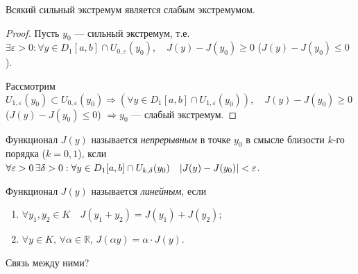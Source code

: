 \begin{utv}
	Всякий сильный экстремум является слабым экстремумом.
\end{utv}
\begin{proof}
	Пусть $y_0$ --- сильный экстремум, т.е. $\exists \varepsilon > 0 : \forall y \in D_1[a, b] \cap U_{0, \varepsilon}(y_0), \quad J(y) - J(y_0) \geqslant 0$ ($J(y) - J(y_0) \leqslant 0$).
	
	Рассмотрим $U_{1, \varepsilon}(y_0) \subset U_{0, \varepsilon}(y_0) \Rightarrow (\forall y \in D_1[a, b] \cap U_{1, \varepsilon}(y_0)), \quad J(y) - J(y_0) \geqslant 0$ ($J(y) - J(y_0) \leqslant 0$) $\Rightarrow y_0$ --- слабый экстремум. 
\end{proof}

\begin{definition}
	Функционал $J(y)$ называется \textit{непрерывным} в точке $y_0$ в смысле близости $k$-го порядка ($k = 0, 1$), ксли $\forall \varepsilon > 0 \, \exists \delta > 0 : \forall y \in D_1[a, b] \cap U_{k, \delta}(y_0) \quad \abs{J(y) - J(y_0)} < \varepsilon$.
\end{definition}

\begin{definition}
	Функционал $J(y)$ называется \textit{линейным}, если
	\begin{enumerate}
		\item $\forall y_1, y_2 \in K \quad J(y_1 + y_2) = J(y_1) + J(y_2)$;
		
		\item $\forall y \in K, \, \forall \alpha \in \mathbb{R}, \, J(\alpha y) = \alpha \cdot J(y)$.
	\end{enumerate}
\end{definition}

Связь между ними? %


